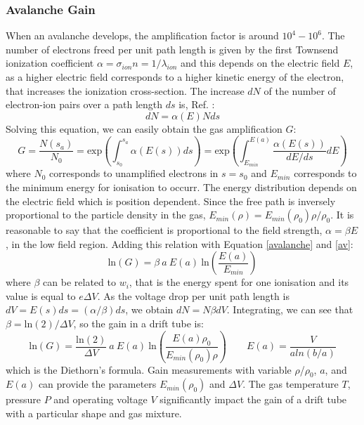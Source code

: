\subsubsection{Avalanche Gain}
When an avalanche develops, the amplification factor is around $10^4-10^6$. The number of electrons freed per unit path length is given
by the first Townsend ionization coefficient $\alpha=\sigma_{ion}n=1/\lambda_{ion}$ and this depends on the electric field $E$, 
as a higher electric field corresponds to a higher kinetic energy of the electron, that increases the ionization cross-section.
The increase $dN$ of the number of electron-ion pairs over a path length $ds$ is, Ref. \cite{kola}:
\begin{equation}
    dN=\alpha(E)Nds
\end{equation}
Solving this equation, we can easily obtain the gas amplification $G$:
\begin{equation}\label{av}
    G=\frac{N(s_a)}{N_0}=\text{exp} \left( \int_{s_0}^{s_a} \alpha(E(s)) ds \right)=\text{exp} \left( \int_{E_{min}}^{E(a)} \frac{\alpha(E(s))}{dE/ds} dE \right)
\end{equation}
where $N_0$ corresponds to unamplified electrons in $s=s_0$ and $E_{min}$ corresponds to the minimum energy 
for ionisation to occurr. The energy distribution depends on the electric field which is position dependent. 
Since the free path is inversely proportional to the particle density in the gas, $E_{min}(\rho)=E_{min}(\rho_0)\rho/\rho_0$.
It is reasonable to say that the coefficient is proportional to the field strength, $\alpha= \beta E$, in the low field region. 
Adding this relation with Equation \ref{avalanche} and \ref{av}:
\begin{equation}
     \text{ln}(G)=\beta \ a \ E(a) \ \text{ln}\left( \frac{E(a)}{E_{min}}\right)
\end{equation}
where $\beta$ can be related to $w_i$, that is the energy spent for one ionisation and its value is equal to $e \Delta V$.
As the voltage drop per unit path length is $dV = E(s)ds = (\alpha/\beta)ds$, we obtain $dN=N \beta dV$. Integrating, we can see that
$\beta= \text{ln}(2)/\Delta V$, so the gain in a drift tube is:
\begin{equation}
     \text{ln}(G)=\frac{ \text{ln}(2)}{\Delta V} \ a \ E(a)  \ \text{ln}\left( \frac{E(a)\rho_0}{E_{min}(\rho_0)\rho}\right) \qquad E(a)=\frac{V}{a ln(b/a)}
\end{equation}
which is the Diethorn's formula. 
Gain measurements with variable $\rho$/$\rho_0$, $a$, and $E(a)$ can provide the parameters $E_{min} (\rho_0)$ and $\Delta V$. 
The gas temperature $T$, pressure $P$ and operating voltage $V$ significantly impact the gain of a drift tube with a particular shape and gas mixture. 

